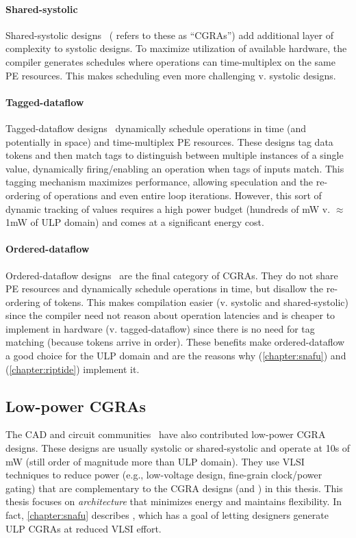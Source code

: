 \paragraph{Shared-systolic}
Shared-systolic designs~\cite{remarc,adres,morphosys,matrix,karunaratne2017hycube} (\cite{weng2020hybrid} refers to these as ``CGRAs'') add additional layer of complexity to systolic designs.
% 
To maximize utilization of available hardware, the compiler generates schedules where operations can time-multiplex on the same PE resources.
% 
This makes scheduling even more challenging v. systolic designs.

\paragraph{Tagged-dataflow}
Tagged-dataflow designs~\cite{swanson2003wavescalar,voitsechov2014single,ttda,trips,parashar2013triggered} dynamically schedule operations in time (and potentially in space) and time-multiplex PE resources.
% 
These designs tag data tokens and then match tags to distinguish between multiple instances of a single value, dynamically firing/enabling an operation when tags of inputs match.
% 
This tagging mechanism maximizes performance, allowing speculation and the re-ordering of operations and even entire loop iterations.
% 
However, this sort of dynamic tracking of values requires a high power budget (hundreds of mW v. $\approx$1mW of ULP domain) and comes at a significant energy cost.

\paragraph{Ordered-dataflow}
\label{chapter:background:cgra:ordered}
Ordered-dataflow designs~\cite{snafu,plasticine,dyser} are the final category of CGRAs.
% 
They do not share PE resources and dynamically schedule operations in time, but disallow the re-ordering of tokens.
% 
This makes compilation easier (v. systolic and shared-systolic) since the compiler need not reason about operation latencies and is cheaper to implement in hardware (v. tagged-dataflow) since there is no need for tag matching (because tokens arrive in order).
% 
These benefits make ordered-dataflow a good choice for the ULP domain and are the reasons why \snafu (\autoref{chapter:snafu}) and \riptide (\autoref{chapter:riptide}) implement it.

\subsection{Low-power CGRAs}
The CAD and circuit communities~\cite{ipa,cma,srp,karunaratne2017hycube} have also contributed low-power CGRA designs.
% 
These designs are usually systolic or shared-systolic and operate at 10s of mW (still order of magnitude more than ULP domain).
% 
They use VLSI techniques to reduce power (e.g., low-voltage design, fine-grain clock/power gating) that are complementary to the CGRA designs (\snafu and \riptide) in this thesis.
%
This thesis focuses on {\em architecture} that minimizes energy and maintains flexibility.
%
In fact, \autoref{chapter:snafu} describes \snafu, which has a goal of letting designers generate ULP CGRAs at reduced VLSI effort.

